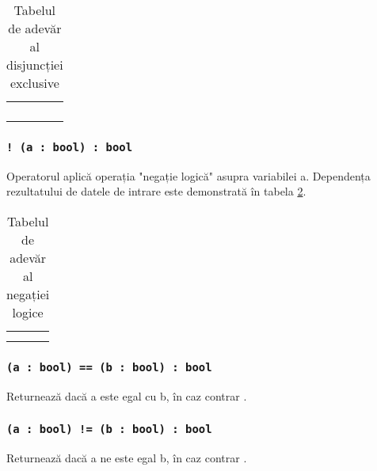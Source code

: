 \begin{table}[htb]
	\caption{Tabelul de adevăr al disjuncției exclusive}
	\label{logdifftable}
	\begin{tabular}{|c|c|c|}
		\hline
		\code{a} & \code{b} & \code{a \^ b} \\ \hline
		\false{} & \false{} & \false{}  	\\ \hline
		\false{} & \true{}  & \true{}   	\\ \hline
		\true{}  & \false{} & \true{}  		\\ \hline
		\true{}  & \true{}  & \false{}  	\\ \hline
	\end{tabular}
	\vspace{0em}
\end{table}

\subsubsection{\lstinline|! (a : bool) : bool|}

Operatorul aplică operația "negație logică" asupra variabilei a. Dependența rezultatului de datele de intrare este demonstrată în tabela  \ref{invtable}.

\begin{table}[htb]
	\caption{Tabelul de adevăr al negației logice}
	\label{invtable}
	\begin{tabular}{|c|c|}
		\hline
		\code{a} & \code{!a} \\ \hline
		\false{} &  \true{}  \\ \hline
		\true{}  & \false{}  \\ \hline
	\end{tabular}
	\vspace{-2em}
\end{table}

\subsubsection{\lstinline|(a : bool) == (b : bool) : bool|}

Returnează \true{} dacă a este egal cu b, în caz contrar \false{}.

\subsubsection{\lstinline|(a : bool) != (b : bool) : bool|}

Returnează \true{} dacă a ne este egal b, în caz contrar \false{}.

